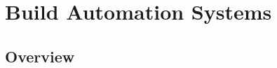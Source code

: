 \documentclass[presentation]{beamer}\mode<presentation>{\usetheme{AMSBolognaFC}}
\begin{document}



\section{Build Automation Systems}

\subsection{Overview}
\end{document}

